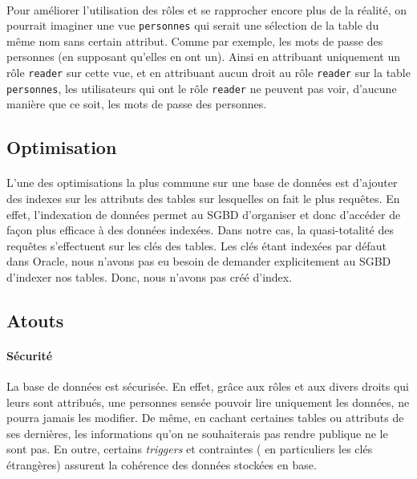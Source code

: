 \paragraph{}{
    Pour am\'{e}liorer l'utilisation des r\^{o}les et se rapprocher encore plus de la r\'{e}alit\'{e}, on pourrait imaginer une vue \verb|personnes| qui serait une s\'{e}lection de la table du même nom sans certain attribut. Comme par exemple, les mots de passe des personnes (en supposant qu'elles en ont un). Ainsi en attribuant uniquement un r\^{o}le \verb|reader| sur cette vue, et en attribuant aucun droit au r\^{o}le \verb|reader| sur la table \verb|personnes|, les utilisateurs qui ont le r\^{o}le \verb|reader| ne peuvent pas voir, d'aucune mani\`{e}re que ce soit, les mots de passe des personnes.
}

\subsection{Optimisation}

\paragraph{}{
    L'une des optimisations la plus commune sur une base de donn\'{e}es est d'ajouter des indexes sur les attributs des tables sur lesquelles on fait le plus requêtes. En effet, l'indexation de donn\'{e}es permet au SGBD d'organiser et donc d'acc\'{e}der de façon plus efficace \`{a} des donn\'{e}es index\'{e}es. \newline
    Dans notre cas, la quasi-totalit\'{e} des requêtes s'effectuent sur les cl\'{e}s des tables. Les cl\'{e}s \'{e}tant index\'{e}es par d\'{e}faut dans Oracle, nous n'avons pas eu besoin de demander explicitement au SGBD d'indexer nos tables. Donc, nous n'avons pas cr\'{e}\'{e} d'index. 
}

\subsection{Atouts}

\paragraph{S\'{e}curit\'{e}}{
   La base de donn\'{e}es est s\'{e}curis\'{e}e. En effet, grâce aux r\^{o}les et aux divers droits qui leurs sont attribu\'{e}s, une personnes sens\'{e}e pouvoir lire uniquement les donn\'{e}es, ne pourra jamais les modifier. De même, en cachant certaines tables ou attributs de ses derni\`{e}res, les informations qu'on ne souhaiterais pas rendre publique ne le sont pas. \newline
   En outre, certains \textit{triggers} et contraintes ( en particuliers les cl\'{e}s \'{e}trang\`{e}res) assurent la coh\'{e}rence des donn\'{e}es stock\'{e}es en base.
}


